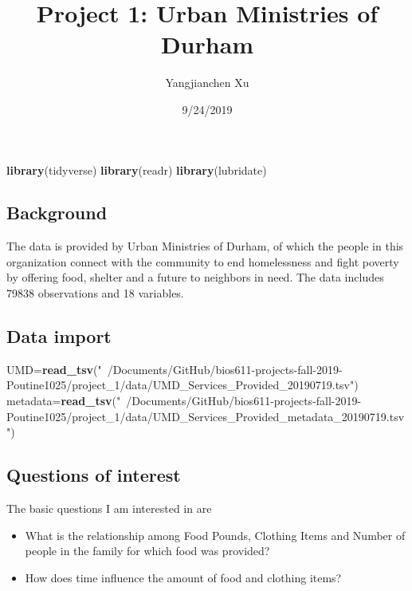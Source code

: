 \documentclass[]{article}
\title{Project 1: Urban Ministries of Durham}
\author{Yangjianchen Xu}
\date{9/24/2019}
\newenvironment{Shaded}{\begin{snugshade}}{\end{snugshade}}
\newcommand{\KeywordTok}[1]{\textcolor[rgb]{0.13,0.29,0.53}{\textbf{#1}}}
\newcommand{\NormalTok}[1]{#1}
\newcommand{\StringTok}[1]{\textcolor[rgb]{0.31,0.60,0.02}{#1}}
\providecommand{\tightlist}{%
  \setlength{\itemsep}{0pt}\setlength{\parskip}{0pt}}
\begin{document}
\maketitle

\begin{Shaded}
\begin{Highlighting}[]
\KeywordTok{library}\NormalTok{(tidyverse)}
\KeywordTok{library}\NormalTok{(readr)}
\KeywordTok{library}\NormalTok{(lubridate)}
\end{Highlighting}
\end{Shaded}

\hypertarget{background}{%
\subsection{Background}\label{background}}

The data is provided by Urban Ministries of Durham, of which the people
in this organization connect with the community to end homelessness and
fight poverty by offering food, shelter and a future to neighbors in
need. The data includes 79838 observations and 18 variables.

\hypertarget{data-import}{%
\subsection{Data import}\label{data-import}}

\begin{Shaded}
\begin{Highlighting}[]
\NormalTok{UMD=}\KeywordTok{read_tsv}\NormalTok{(}\StringTok{"~/Documents/GitHub/bios611-projects-fall-2019-Poutine1025/project_1/data/UMD_Services_Provided_20190719.tsv"}\NormalTok{)}
\NormalTok{metadata=}\KeywordTok{read_tsv}\NormalTok{(}\StringTok{"~/Documents/GitHub/bios611-projects-fall-2019-Poutine1025/project_1/data/UMD_Services_Provided_metadata_20190719.tsv"}\NormalTok{)}
\end{Highlighting}
\end{Shaded}

\hypertarget{questions-of-interest}{%
\subsection{Questions of interest}\label{questions-of-interest}}

The basic questions I am interested in are

\begin{itemize}
\tightlist
\item
  What is the relationship among Food Pounds, Clothing Items and Number
  of people in the family for which food was provided?
\item
  How does time influence the amount of food and clothing items?
\end{itemize}
\end{document}
